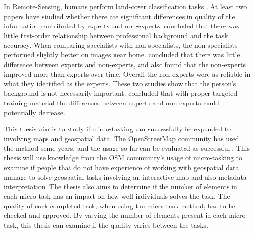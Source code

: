 In Remote-Sensing, humans perform land-cover classification tasks \citep{Salk2016}. At least two papers have studied whether there are significant differences in quality of the information contributed by experts and non-experts.
\cite{Salk2016} concluded that there was little first-order relationship between professional background and the task accuracy.
When comparing specialists with non-specialists, the non-specialists performed slightly better on images near home. 
\cite{See2013} concluded that there was little difference between experts and non-experts, and also found that the non-experts improved more than experts over time. Overall the non-experts were as reliable in what they identified as the experts. These two studies show that the person's background is not necessarily important. \cite{See2013} concluded that with proper targeted training material the differences between experts and non-experts could potentially decrease.   

This thesis aim is to study if micro-tasking can successfully be expanded to involving maps and geospatial data. The OpenStreetMap community has used the method some years, and the usage so far can be evaluated as successful \citep{Erichsen2016}. This thesis will use knowledge from the OSM community's usage of micro-tasking to examine if people that do not have experience of working with geospatial data manage to solve geospatial tasks involving an interactive map and also metadata interpretation. The thesis also aims to determine if the number of elements in each micro-task has an impact on how well individuals solves the task. The quality of each completed task, when using the micro-task method, has to be checked and approved. By varying the number of elements present in each micro-task, this thesis can examine if the quality varies between the tasks. 

